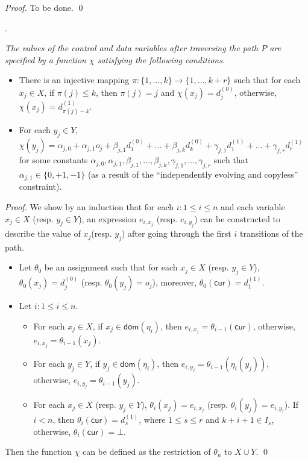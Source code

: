 \documentclass[runningheads,a4paper]{llncs}
\newcommand\cur{\mathsf{cur}}
\newcommand\dom{\mathsf{dom}}
\begin{document}
\begin{appendix}
\smallskip

\begin{proof}
To be done.
\qed
\end{proof}


.
{\it The values of the control and data variables after traversing the path $P$ are specified by a function $\chi$ satisfying the following conditions.
\begin{itemize}
\item There is an injective mapping $\pi: \{1,\dots,k\} \rightarrow \{1,\dots, k+r\}$ such that for each $x_j \in X$, if $\pi(j) \le k$, then $\pi(j)=j$ and $\chi(x_j)=d^{(0)}_{j}$, otherwise, $\chi(x_j)=d^{(1)}_{\pi(j)-k}$.
% 
\item For each $y_j \in Y$, $\chi(y_j) = \alpha_{j,0} + \alpha_{j,1} o_j + \beta_{j,1} d^{(0)}_1 + \dots + \beta_{j,k} d^{(0)}_k + \gamma_{j,1} d^{(1)}_1 +\dots + \gamma_{j,r} d^{(1)}_{r}$ for some constants $\alpha_{j,0},\alpha_{j,1}, \beta_{j,1},\dots,\beta_{j,k}, \gamma_{j,1},\dots,\gamma_{j,r}$ such that $\alpha_{j,1} \in \{0,+1,-1\}$ (as a result of the ``independently evolving and copyless'' constraint).
\end{itemize}
}

\begin{proof}
We show by an induction that for each $i: 1 \le i \le n$ and each variable $x_j \in X$ (resp. $y_j \in Y$), an expression $e_{i,x_j}$ (resp. $e_{i,y_j}$) can be constructed to describe the value of $x_j$(resp. $y_j$) after going through the first $i$ transitions of the path. 
%
\begin{itemize}
\item Let $\theta_0$ be an assignment such that for each $x_j \in X$ (resp. $y_j \in Y$), $\theta_0(x_j)=d^{(0)}_j$ (resp. $\theta_0(y_j)=o_j$), moreover, $\theta_0(\cur)=d^{(1)}_1$.
%
%
\item Let $i: 1 \le i \le n$. 
\begin{itemize}
\item For each $x_j \in X$, if $x_j \in \dom(\eta_i)$, then $e_{i,x_j}=\theta_{i-1}(\cur)$, otherwise, $e_{i,x_j}=\theta_{i-1}(x_j)$.
%
\item For each $y_j \in Y$, if $y_j \in \dom(\eta_i)$, then $e_{i,y_j} = \theta_{i-1}(\eta_i(y_j))$, otherwise, $e_{i,y_j}=\theta_{i-1}(y_j)$.
%
\item For each $x_{j} \in X$ (resp. $y_j \in Y$), $\theta_i(x_{j})=e_{i,x_{j}}$ (resp. $\theta_i(y_{j})=e_{i, y_{j}}$). If $i < n$, then $\theta_i(\cur)=d^{(1)}_{s}$, where $1\le s \le r$ and $k+i + 1 \in I_s$, otherwise, $\theta_i(\cur)=\bot$.
\end{itemize}
\end{itemize}
Then the function $\chi$ can be defined as the restriction of $\theta_n$ to $X \cup Y$.
\qed
\end{proof}



\end{appendix}
\end{document}

